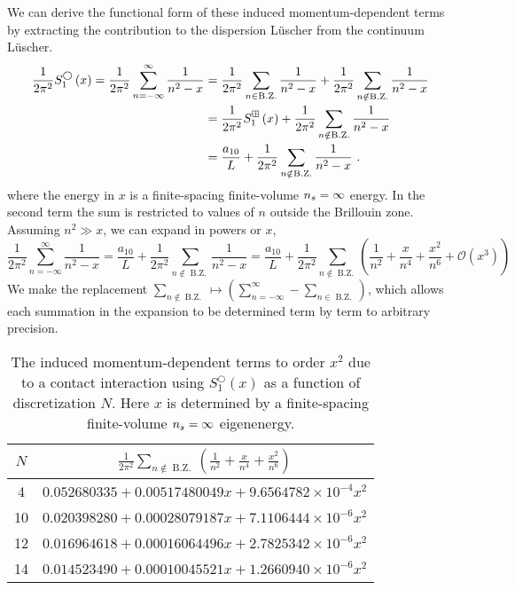 We can derive the functional form of these induced momentum-dependent terms by extracting the contribution to the dispersion L\"uscher from the continuum L\"uscher.
\begin{align*}
 \frac{1}{2 \pi^{2}} S^\bigcirc_{1}\left(x\right)=\frac{1}{2 \pi^{2}} \sum_{n=-\infty}^{\infty} \frac{1}{n^{2}-x} &=\frac{1}{2 \pi^{2}} \sum_{n\in \operatorname{B.Z.}} \frac{1}{n^{2}-x} +\frac{1}{2 \pi^{2}} \sum_{n\notin \operatorname{B.Z.}} \frac{1}{n^{2}-x} \\
 &= \frac{1}{2 \pi^{2}} S^{\boxplus}_{1}\left(x\right)+\frac{1}{2 \pi^{2}} \sum_{n\notin \operatorname{B.Z.}} \frac{1}{n^{2}-x}\\
&=\frac{a_{10}}{L}+\frac{1}{2 \pi^{2}} \sum_{n\notin \operatorname{B.Z.}} \frac{1}{n^{2}-x} \ .
\end{align*}
where the energy in $x$ is a finite-spacing finite-volume ${n_s}=\infty$ energy.
In the second term the sum is restricted to values of $n$ outside the Brillouin zone.
Assuming $n^2\gg x$, we can expand in powers or $x$,
\begin{equation}
    \frac{1}{2 \pi^{2}} \sum_{n=-\infty}^{\infty} \frac{1}{n^{2}-x}
        =
    \frac{a_{10}}{L}+\frac{1}{2 \pi^{2}} \sum_{n\notin \operatorname{B.Z.}} \frac{1}{n^{2}-x}
        =
    \frac{a_{10}}{L}+\frac{1}{2 \pi^{2}} \sum_{n\notin \operatorname{B.Z.}} \left(\frac{1}{n^2}+\frac{x}{n^4}+\frac{x^2}{n^6}+\mathcal{O}(x^3)\right)
\end{equation}
We make the replacement $\sum_{n\notin\operatorname{B.Z.}}\mapsto\left(\sum_{n=-\infty}^\infty-\sum_{n\in\operatorname{B.Z.}}\right)$, which allows each summation in the expansion to be determined term by term to arbitrary precision.

\begin{table}
    \caption{
    The induced momentum-dependent terms to order $x^2$ due to a contact interaction using $S^\bigcirc_1(x)$ as a function of discretization $N$.
    Here $x$ is determined by a finite-spacing finite-volume ${n_s}=\infty$ eigenenergy.}
    \label{tab:induced terms in 1 d}
    \begin{tabular}{c|c}
    $N$
        &
            $\frac{1}{2 \pi^{2}} \sum_{n\notin \operatorname{B.Z.}} \left(\frac{1}{n^2}+\frac{x}{n^4}+\frac{x^2}{n^6}\right)$       \\
        \hline
      4 &    $0.052680335 + 0.00517480049 x + 9.6564782\times10^{-4} x^2$\\
    10  &   $0.020398280 + 0.00028079187 x + 7.1106444\times10^{-6} x^2$    \\
    12  &   $0.016964618 + 0.00016064496 x + 2.7825342\times10^{-6} x^2$    \\
    14  &   $0.014523490 + 0.00010045521 x + 1.2660940\times10^{-6} x^2$    \\
    \end{tabular}
\end{table}

